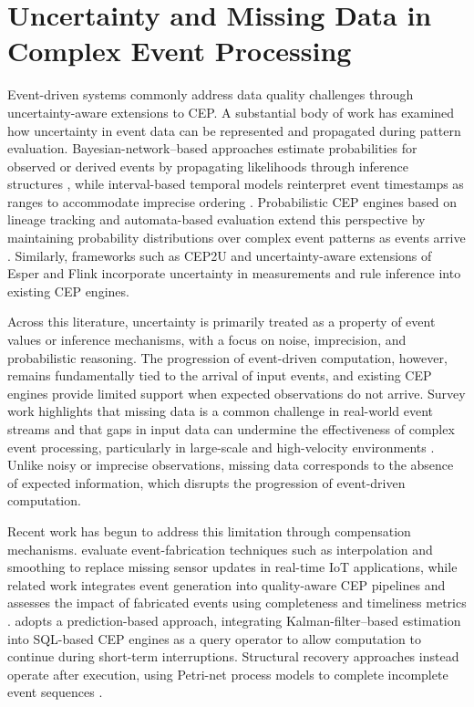 \section{Uncertainty and Missing Data in Complex Event Processing}
Event-driven systems commonly address data quality challenges through uncertainty-aware extensions to CEP. A substantial body of work has examined how uncertainty in event data can be represented and propagated during pattern evaluation. Bayesian-network–based approaches estimate probabilities for observed or derived events by propagating likelihoods through inference structures \citep{wasserkrug2010efficient, wasserkrug2012model}, while interval-based temporal models reinterpret event timestamps as ranges to accommodate imprecise ordering \citep{zhang2013recognizing}. Probabilistic CEP engines based on lineage tracking and automata-based evaluation extend this perspective by maintaining probability distributions over complex event patterns as events arrive \citep{shen2008probabilistic, kawashima2010complex, chuanfei2010complex, wang2013complex}. Similarly, frameworks such as CEP2U \citep{cugola2015introducing} and uncertainty-aware extensions of Esper and Flink \citep{moreno2019managing} incorporate uncertainty in measurements and rule inference into existing CEP engines.

Across this literature, uncertainty is primarily treated as a property of event values or inference mechanisms, with a focus on noise, imprecision, and probabilistic reasoning. The progression of event-driven computation, however, remains fundamentally tied to the arrival of input events, and existing CEP engines provide limited support when expected observations do not arrive. Survey work highlights that missing data is a common challenge in real-world event streams and that gaps in input data can undermine the effectiveness of complex event processing, particularly in large-scale and high-velocity environments \citep{tawsif2018review}. Unlike noisy or imprecise observations, missing data corresponds to the absence of expected information, which disrupts the progression of event-driven computation.

Recent work has begun to address this limitation through compensation mechanisms. \citet{gkoulis2025assessing} evaluate event-fabrication techniques such as interpolation and smoothing to replace missing sensor updates in real-time IoT applications, while related work integrates event generation into quality-aware CEP pipelines and assesses the impact of fabricated events using completeness and timeliness metrics \citep{gkoulis2024hybrid}. \citet{vijayakumar2009missing} adopts a prediction-based approach, integrating Kalman-filter–based estimation into SQL-based CEP engines as a query operator to allow computation to continue during short-term interruptions. Structural recovery approaches instead operate after execution, using Petri-net process models to complete incomplete event sequences \citep{wang2013efficient}.

